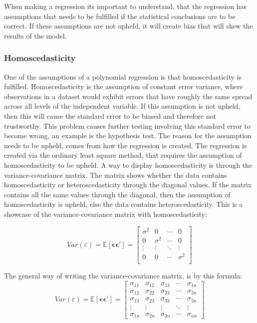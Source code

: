 When making a regression its important to understand, that the regression has assumptions that needs to be fulfilled if the statistical conclusions are to be correct. If these assumptions are not upheld, it will create bias that will skew the results of the model.
\subsubsection{Homoscedasticity}
One of the assumptions of a polynomial regression is that homoscedasticity is fulfilled. Homoscedasticity is the assumption of constant error variance, where observations in a dataset would exhibit errors that have roughly the same spread across all levels of the independent variable.
\newline
If this assumption is not upheld, then this will cause the standard error to be biased and therefore not trustworthy. This problem causes further testing involving this standard error to become wrong, an example is the hypothesis test.
\newline
The reason for the assumption needs to be upheld, comes from how the regression is created. The regression is created via the ordinary least square method, that requires the assumption of homoscedasticity to be upheld.
\newline
A way to display homoscedasticity is through the variance-covariance matrix. The matrix shows whether the data contains homoscedasticity or heteroscedasticity through the diagonal values. If the matrix contains all the same values through the diagonal, then the assumption of homoscedasticity is upheld, else the data contains heteroscedasticity. This is a showcase of the variance-covariance matrix with homoscedasticity:


	
\[ 
Var(\varepsilon) = \mathbb{E}[\boldsymbol{\epsilon} \boldsymbol{\epsilon}'] = 
\left[
\begin{array}{cccc}
	\sigma^2 & 0        & \cdots & 0 \\
	0        & \sigma^2 & \cdots & 0 \\
	\vdots   & \vdots   & \ddots & \vdots \\
	0        & 0        & \cdots & \sigma^2 \\
\end{array}
\right]
\]


The general way of writing the variance-covariance matrix, is by this formula:
\[
Var(\varepsilon) = \mathbb{E}[\boldsymbol{\epsilon} \boldsymbol{\epsilon}'] = 
\left[
\begin{array}{ccccc}
	\sigma_{11} & \sigma_{12} & \sigma_{13} & \cdots & \sigma_{1n} \\
	\sigma_{12} & \sigma_{22} & \sigma_{23} & \cdots & \sigma_{2n} \\
	\sigma_{13} & \sigma_{23} & \sigma_{33} & \cdots & \sigma_{3n} \\
	\vdots      & \vdots      & \vdots      & \ddots & \vdots      \\
	\sigma_{1n} & \sigma_{2n} & \sigma_{3n} & \cdots & \sigma_{nn}
\end{array}
\right]
\]

